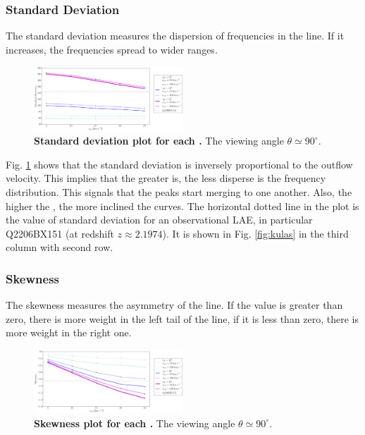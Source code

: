 \documentclass{latex/emulateapj}
\begin{document}
\subsubsection{Standard Deviation}
The standard deviation measures the dispersion of frequencies in the \lya line. If it increases, the frequencies spread to wider ranges. \\

\begin{figure}[h!]
	\begin{center}
		\includegraphics[width=0.5\textwidth]{./figures/std}
	\end{center}
	\caption{\textbf{Standard deviation plot for each \tauh.} The viewing angle $\theta \simeq 90^\circ$.
		\label{fig:std}}
\end{figure}

Fig. \ref{fig:std} shows that the standard deviation is inversely proportional to the outflow velocity. This implies that the greater \vout is, the less disperse is the \lya frequency distribution. This signals that the peaks start merging to one another. Also, the higher the \tauh, the more inclined the curves. The horizontal dotted line in the plot is the value of standard deviation for an observational LAE, in particular Q2206BX151 (at redshift $z\approx2.1974$). It is shown in Fig. \ref{fig:kulas} in the third column with second row. \\

\subsubsection{Skewness}
The skewness measures the asymmetry of the \lya line. If the value is greater than zero, there is more weight in the left tail of the line, if it is less than zero, there is more weight in the right one.\\

\begin{figure}[h!]
	\begin{center}
		\includegraphics[width=0.5\textwidth]{./figures/skw}
	\end{center}
	\caption{\textbf{Skewness plot for each \tauh.} The viewing angle $\theta \simeq 90^\circ$. 
		\label{fig:skw}}
\end{figure}
\end{document}
